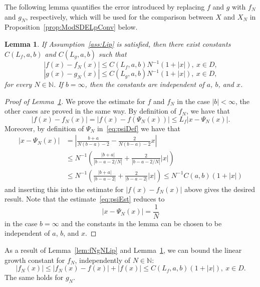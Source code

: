 \documentclass[11pt]{amsart}
\newtheorem{lemma}[theorem]{Lemma}
\begin{document}
{The following lemma quantifies the error introduced by replacing $f$ and $g$ with $f_{N}$ and $g_{N}$, respectively, which will be used for the comparison between $X$ and $X_{N}$ in Proposition~\ref{prop:ModSDELpConv} below.
\begin{lemma}\label{lem:fNgNdiff}
If Assumption~\ref{ass:Lip} is satisfied, then there exist constants $C(L_{f},a,b)$ and $C(L_{g},a,b)$ such that
\begin{equation*}
\left| f(x) - f_{N}(x) \right| \leq C(L_{f},a,b) N^{-1} (1 + |x|),\ x \in D,
\end{equation*}
\begin{equation*}
\left| g(x) - g_{N}(x) \right| \leq C(L_{g},a,b) N^{-1} (1 + |x|),\ x \in D,
\end{equation*}
for every $N \in \mathbb{N}$. If $b=\infty$, then the constants are independent of $a$, $b$, and $x$.
\end{lemma}
\begin{proof}[Proof of Lemma~\ref{lem:fNgNdiff}]
We prove the estimate for $f$ and $f_{N}$ in the case $|b|<\infty$, the other cases are proved in the same way. By definition of $f_{N}$, we have that
\begin{equation*}
|f(x) - f_{N}(x)| = |f(x)-f(\Psi_{N}(x))| \leq L_{f} |x - \Psi_{N}(x)|.
\end{equation*}
Moreover, by definition of $\Psi_{N}$ in~\eqref{eq:psiDef} we have that
\begin{equation}\label{eq:psiEst}
  \begin{split}
    \left| x - \Psi_{N}(x) \right| &= \left| \frac{b + a}{N (b-a) - 2} - \frac{2}{N (b-a) - 2} x\right| \\ &\leq N^{-1} \left( \frac{|b+a|}{|b-a-2/N|} + \frac{2}{|b-a-2/N|} |x| \right) \\
    &\leq N^{-1} \left( \frac{|b+a|}{|b-a-2|} + \frac{2}{|b-a-2|} |x| \right) \leq N^{-1} C(a,b) (1 + |x|)
  \end{split}
\end{equation}
and inserting this into the estimate for $|f(x) - f_{N}(x)|$ above gives the desired result. Note that the estimate~\eqref{eq:psiEst} reduces to
\begin{equation*}
\left| x - \Psi_{N}(x) \right| = \frac{1}{N}
\end{equation*}
in the case $b = \infty$ and the constants in the lemma can be chosen to be independent of $a$, $b$, and $x$.
\end{proof}
As a result of Lemma~\ref{lem:fNgNLip} and Lemma~\ref{lem:fNgNdiff}, we can bound the linear growth constant for $f_{N}$, independently of $N \in \mathbb{N}$:
\begin{equation}\label{eq:fNLG}
|f_{N}(x)| \leq |f_{N}(x)-f(x)| + |f(x)| \leq C(L_{f},a,b) (1 + |x| ),\ x \in D.
\end{equation}
The same holds for $g_{N}$.

}
\end{document}
